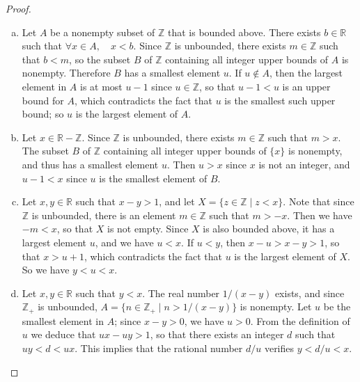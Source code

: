 \documentclass[11pt,a4paper,twoside]{article}
\theoremstyle{definition}
\begin{document}
\begin{proof}\hfill

  \begin{enumerate}[(a)]

  \item Let $A$ be a nonempty subset of $\mathbb{Z}$ that is bounded above. There exists $b \in \mathbb{R}$ such that $\forall x \in A, \quad x < b$.
    Since $\mathbb{Z}$ is unbounded, there exists $m \in \mathbb{Z}$ such that $b < m$, so the subset $B$ of $\mathbb{Z}$ containing all integer upper bounds of $A$ is nonempty.
    Therefore $B$ has a smallest element $u$. If $u \notin A$, then the largest element in $A$ is at most $u - 1$ since $u \in \mathbb{Z}$,
    so that $u - 1 < u$ is an upper bound for $A$, which contradicts the fact that $u$ is the smallest such upper bound; so $u$ is the largest element of $A$.

  \item Let $x \in \mathbb{R} - \mathbb{Z}$. Since $\mathbb{Z}$ is unbounded, there exists $m \in \mathbb{Z}$ such that $m > x$.
    The subset $B$ of $\mathbb{Z}$ containing all integer upper bounds of $\{ x \}$ is nonempty, and thus has a smallest element $u$.
    Then $u > x$ since $x$ is not an integer, and $u - 1 < x$ since $u$ is the smallest element of $B$.

  \item Let $x, y \in \mathbb{R}$ such that $x - y > 1$, and let $X = \{ z \in \mathbb{Z} \mid z < x \}$. Note that since $\mathbb{Z}$ is unbounded, there is an element $m \in \mathbb{Z}$
    such that $m > -x$. Then we have $-m < x$, so that $X$ is not empty. Since $X$ is also bounded above, it has a largest element $u$, and we have $u < x$.
    If $u < y$, then $x - u > x - y > 1$, so that $x > u + 1$, which contradicts the fact that $u$ is the largest element of $X$. So we have $y < u < x$.

  \item Let $x, y \in \mathbb{R}$ such that $y < x$. The real number $1 / (x - y)$ exists, and since $\mathbb{Z}_+$ is unbounded, $A = \{ n \in \mathbb{Z}_+ \mid n > 1 / (x - y) \}$
    is nonempty. Let $u$ be the smallest element in $A$; since $x - y > 0$, we have $u > 0$. From the definition of $u$ we deduce that $u x - u y > 1$, so that there exists an integer $d$ such that
    $u y < d < u x$. This implies that the rational number $d / u$ verifies $y < d / u < x$.

  \end{enumerate}

\end{proof}
\end{document}
